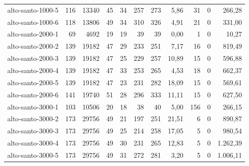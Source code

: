 \begin{table}[ht!]
{\begin{tabular}{lrrrrrrrrrr}
			\rowcolor{rowlight}alto-santo-1000-5                                                   & 116 & 13340  & 45  & 34 & 257 & 273 & 5,86  & 31  & 0 & 266,28   \\
			\rowcolor{rowlight}alto-santo-1000-6                                                   & 118 & 13806  & 49  & 34 & 310 & 326 & 4,91  & 21  & 0 & 331,00   \\
			\rowcolor{rowgrey}alto-santo-2000-1                                                    & 69  & 4692   & 19  & 19 & 39  & 39  & 0,00  & 1   & 0 & 10,27    \\
			\rowcolor{rowlight}alto-santo-2000-2                                                   & 139 & 19182  & 47  & 29 & 233 & 251 & 7,17  & 16  & 0 & 819,49   \\
			\rowcolor{rowlight}alto-santo-2000-3                                                   & 139 & 19182  & 47  & 25 & 229 & 257 & 10,89 & 15  & 0 & 596,88   \\
			\rowcolor{rowlight}alto-santo-2000-4                                                   & 139 & 19182  & 47  & 33 & 253 & 265 & 4,53  & 18  & 0 & 662,37   \\
			\rowcolor{rowlight}alto-santo-2000-5                                                   & 139 & 19182  & 47  & 23 & 231 & 282 & 18,09 & 15  & 0 & 569,61   \\
			\rowcolor{rowlight}alto-santo-2000-6                                                   & 141 & 19740  & 51  & 28 & 296 & 333 & 11,11 & 15  & 0 & 627,50   \\
			\rowcolor{rowlight}alto-santo-3000-1                                                   & 103 & 10506  & 20  & 18 & 38  & 40  & 5,00  & 156 & 0 & 266,15   \\
			\rowcolor{rowlight}alto-santo-3000-2                                                   & 173 & 29756  & 49  & 21 & 197 & 251 & 21,51 & 6   & 0 & 890,87   \\
			\rowcolor{rowlight}alto-santo-3000-3                                                   & 173 & 29756  & 49  & 25 & 214 & 258 & 17,05 & 5   & 0 & 980,54   \\
			\rowcolor{rowlight}alto-santo-3000-4                                                   & 173 & 29756  & 49  & 30 & 231 & 265 & 12,83 & 5   & 0 & 1.262,39 \\
			\rowcolor{rowlight}alto-santo-3000-5                                                   & 173 & 29756  & 49  & 31 & 272 & 281 & 3,20  & 5   & 0 & 1.006,11 \\

\end{tabular}}
\end{table}
